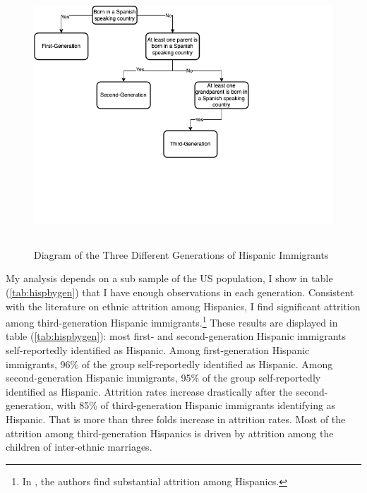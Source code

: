 \documentclass[12pt, fullpage]{article}
\begin{document}
\begin{center}
\begin{figure}[H]
\caption{Diagram of the Three Different Generations of Hispanic Immigrants}
\includegraphics[width=\textwidth, height=9cm]{figure/diag.png} 
\label{fig:diag}
\end{figure}
\hfill%
\end{center}

My analysis depends on a sub sample of the US population, I show in table (\ref{tab:hispbygen}) that I have enough observations in each generation. Consistent with the literature on ethnic attrition among Hispanics, I find significant attrition among third-generation Hispanic immigrants.\footnote{In \citet{duncanIdentifyingLaterGenerationDescendants2018,duncanSocioeconomicIntegrationImmigrant2018, antmanEthnicAttritionObserved2016,antmanEthnicAttritionAssimilation2020}, the authors find substantial attrition among Hispanics.} These results are displayed in table (\ref{tab:hispbygen}): most first- and second-generation Hispanic immigrants self-reportedly identified as Hispanic. Among first-generation Hispanic immigrants, 96\% of the group self-reportedly identified as Hispanic. Among second-generation Hispanic immigrants, 95\% of the group self-reportedly identified as Hispanic. Attrition rates increase drastically after the second-generation, with 85\% of third-generation Hispanic immigrants identifying as Hispanic. That is more than three folds increase in attrition rates. Most of the attrition among third-generation Hispanics is driven by attrition among the children of inter-ethnic marriages.


\end{document}
